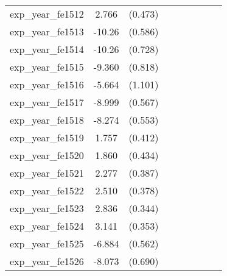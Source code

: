 {\begin{tabular}{l*{4}{cc}}
exp\_year\_fe1512&    2.766\sym{***}&  (0.473)&                  &         &                  &         &                  &         \\
exp\_year\_fe1513&   -10.26\sym{***}&  (0.586)&                  &         &                  &         &                  &         \\
exp\_year\_fe1514&   -10.26\sym{***}&  (0.728)&                  &         &                  &         &                  &         \\
exp\_year\_fe1515&   -9.360\sym{***}&  (0.818)&                  &         &                  &         &                  &         \\
exp\_year\_fe1516&   -5.664\sym{***}&  (1.101)&                  &         &                  &         &                  &         \\
exp\_year\_fe1517&   -8.999\sym{***}&  (0.567)&                  &         &                  &         &                  &         \\
exp\_year\_fe1518&   -8.274\sym{***}&  (0.553)&                  &         &                  &         &                  &         \\
exp\_year\_fe1519&    1.757\sym{***}&  (0.412)&                  &         &                  &         &                  &         \\
exp\_year\_fe1520&    1.860\sym{***}&  (0.434)&                  &         &                  &         &                  &         \\
exp\_year\_fe1521&    2.277\sym{***}&  (0.387)&                  &         &                  &         &                  &         \\
exp\_year\_fe1522&    2.510\sym{***}&  (0.378)&                  &         &                  &         &                  &         \\
exp\_year\_fe1523&    2.836\sym{***}&  (0.344)&                  &         &                  &         &                  &         \\
exp\_year\_fe1524&    3.141\sym{***}&  (0.353)&                  &         &                  &         &                  &         \\
exp\_year\_fe1525&   -6.884\sym{***}&  (0.562)&                  &         &                  &         &                  &         \\
exp\_year\_fe1526&   -8.073\sym{***}&  (0.690)&                  &         &                  &         &                  &         \\

\end{tabular}}
